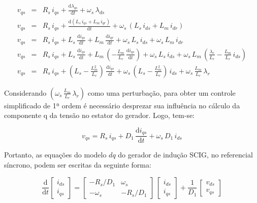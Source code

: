 \begin{eqnarray}
\label{eq:equac_vqs}
  v_{qs} &=& R_{s}\,i_{qs} + \frac{\mathrm{d} \lambda_{qs}}{\mathrm{d} t} + \omega_{s}\,\lambda_{ds}
  \\
  v_{qs} &=& R_{s}\,i_{qs} + \frac{\mathrm{d} (L_s\,i_{qs} + L_m\,i_{qr})}{\mathrm{d} t} + \omega_{s}\,(L_s\,i_{ds} + L_m\,i_{dr})
  \\
  v_{qs} &=& R_{s}\,i_{qs} + L_{s}\,\frac{\mathrm{d} i_{qs}}{\mathrm{d} t} + L_{m}\,\frac{\mathrm{d} i_{qr}}{\mathrm{d} t} + \omega_{s}\,L_s\,i_{ds} + \omega_{s}\,L_m\,i_{dr}
  \\
  v_{qs} &=& R_{s}\,i_{qs} + L_{s}\,\frac{\mathrm{d} i_{qs}}{\mathrm{d} t} + L_{m}\,\left(-\frac{L_m}{L_r}\,\frac{\mathrm{d} i_{qs}}{\mathrm{d} t}\right) + \omega_{s}\,L_s\,i_{ds} + \omega_{s}\,L_m\,\left(\frac{\lambda_r}{L_r} - \frac{L_m}{L_r}\,i_{ds}\right)
  \\
  v_{qs} &=& R_{s}\,i_{qs} + \left (L_s - \frac{L_m^2}{L_r} \right)\,\frac{\mathrm{d} i_{qs}}{\mathrm{d} t} + \omega_{s}\,\left (L_s - \frac{L_m^2}{L_r} \right)\,i_{ds} + \omega_{s}\,\frac{L_m}{L_r}\,\lambda_r
\end{eqnarray}


Considerando $\left(\omega_{s}\,\frac{L_m}{L_r}\,\lambda_r \right)$ como uma perturbação, para obter um controle simplificado de 1ª ordem é necessário desprezar sua influência no cálculo da componente q da tensão no estator do gerador. Logo, tem-se:

\begin{equation}
\label{eq:vqs}
  v_{qs} = R_{s}\,i_{qs} + D_1\,\frac{\mathrm{d} i_{qs}}{\mathrm{d} t} + \omega_{s}\,D_1\,i_{ds}
\end{equation}

Portanto, as equações do modelo $dq$ do gerador de indução \ac{SCIG}, no referencial síncrono, podem ser escritas da seguinte forma:

\begin{equation}
\frac{\mathrm{d} }{\mathrm{d} t}
\begin{bmatrix}
i_{ds} \\ i_{qs}
\end{bmatrix}
=
\begin{bmatrix}
-R_s/D_1 & \omega_s \\ -\omega_s & -R_s/D_1
\end{bmatrix}
\,
\begin{bmatrix}
i_{ds} \\ i_{qs}
\end{bmatrix}
+
\frac{1}{D_1}
\,
\begin{bmatrix}
v_{ds} \\ v_{qs}
\end{bmatrix}
\end{equation}


